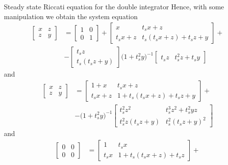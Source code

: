 \documentclass[12pt,a4paper,oneside]{book}
\begin{document}
\begin{onehalfspace}
\begin{example}{Steady state Riccati equation for the double integrator}
Hence, with some manipulation we obtain the system equation
\begin{equation}\label{example_riccati_eq5}
	\begin{aligned}
		\begin{bmatrix}x&z\\z&y\end{bmatrix} &=\begin{bmatrix}1&0\\0&1\end{bmatrix} + 
		\begin{bmatrix}x&t_sx+z\\t_sx+z&t_s(t_sx+z)+t_sz+y\end{bmatrix} + \\[6pt]
		&-\begin{bmatrix}t_sz\\t_s(t_sz+y)\end{bmatrix} \Big(1+t_s^2y\Big)^{-1}\begin{bmatrix} t_sz& t_s^2z+t_sy\end{bmatrix}
	\end{aligned}
\end{equation}
and
\begin{equation}\label{example_riccati_eq6}
	\begin{aligned}
		\begin{bmatrix}x&z\\z&y\end{bmatrix} &= \begin{bmatrix}1+x&t_sx+z\\t_sx+z&1+t_s(t_sx+z)+t_sz+y\end{bmatrix} + \\[6pt]
		&-\Big(1+t_s^2y\Big)^{-1}\begin{bmatrix}t_s^2z^2 & t_s^3z^2+t_s^2yz \\ t_s^2z(t_sz+y) & t_s^2(t_sz+y)^2\end{bmatrix}
	\end{aligned}
\end{equation}
and 
\begin{equation}\label{example_riccati_eq7}
	\begin{aligned}
		\begin{bmatrix}0&0\\0&0\end{bmatrix} &= \begin{bmatrix}1&t_sx\\t_sx&1+t_s(t_sx+z)+t_sz\end{bmatrix} + \\[6pt]

\end{aligned}
\end{equation}
\end{example}
\end{onehalfspace}
\end{document}
